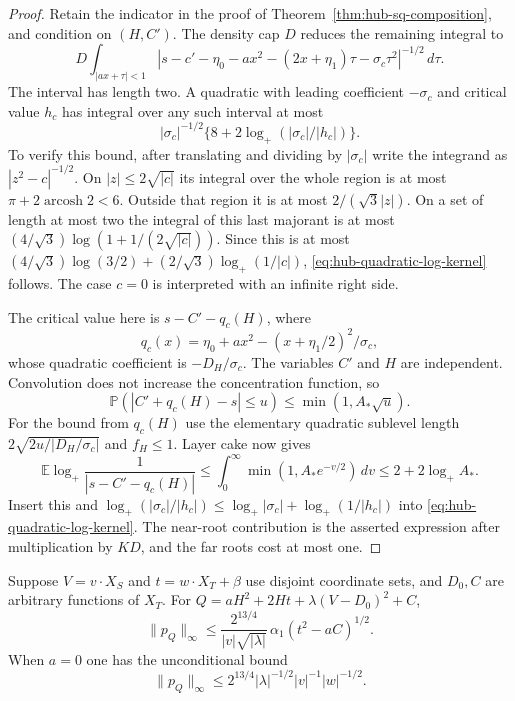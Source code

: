 \begin{proof}
Retain the indicator in the proof of
Theorem~\ref{thm:hub-sq-composition}, and condition on $(H,C')$.
The density cap $D$ reduces the remaining integral to
\[
 D\int_{|ax+\tau|<1}
 |s-c'-\eta_0-ax^2-(2x+\eta_1)\tau-\sigma_c\tau^2|^{-1/2}
                                                        \,d\tau.
\]
The interval has length two.  A quadratic with leading
coefficient $-\sigma_c$ and critical value $h_c$ has integral
over any such interval at most
\begin{equation}\label{eq:hub-quadratic-log-kernel}
 |\sigma_c|^{-1/2}
       \{8+2\log_+(|\sigma_c|/|h_c|)\}.
\end{equation}
To verify this bound, after translating and dividing by
$|\sigma_c|$ write the integrand as $|z^2-c|^{-1/2}$.
On $|z|\le2\sqrt{|c|}$ its integral over the whole region
is at most $\pi+2\operatorname{arcosh}2<6$.
Outside that region it is at most $2/(\sqrt3|z|)$.
On a set of length at most two the integral of this last
majorant is at most
$(4/\sqrt3)\log(1+1/(2\sqrt{|c|}))$.
Since this is at most
$(4/\sqrt3)\log(3/2)+(2/\sqrt3)\log_+(1/|c|)$,
\eqref{eq:hub-quadratic-log-kernel} follows.  The case $c=0$
is interpreted with an infinite right side.

The critical value here is $s-C'-q_c(H)$, where
\[
 q_c(x)=\eta_0+ax^2-(x+\eta_1/2)^2/\sigma_c,
\]
whose quadratic coefficient is $-D_H/\sigma_c$.
The variables $C'$ and $H$ are independent.
Convolution does not increase the concentration function, so
\[
 \mathbb P(|C'+q_c(H)-s|\le u)
 \le\min(1,A_*\sqrt u).
\]
For the bound from $q_c(H)$ use the elementary quadratic
sublevel length $2\sqrt{2u/|D_H/\sigma_c|}$ and $f_H\le1$.
Layer cake now gives
\[
 \mathbb E\log_+\frac1{|s-C'-q_c(H)|}
 \le\int_0^\infty\min(1,A_*e^{-v/2})\,dv
 \le2+2\log_+ A_*.
\]
Insert this and
$\log_+(|\sigma_c|/|h_c|)
\le\log_+|\sigma_c|+\log_+(1/|h_c|)$
into \eqref{eq:hub-quadratic-log-kernel}.
The near-root contribution is the asserted expression after
multiplication by $KD$, and the far roots cost at most one.
\end{proof}

\begin{corollary}
\label{cor:hub-sq-independent}
Suppose $V=v\cdot X_S$ and $t=w\cdot X_T+\beta$ use disjoint
coordinate sets, and $D_0,C$ are arbitrary functions of $X_T$.
For
$Q=aH^2+2Ht+\lambda(V-D_0)^2+C$,
\[
 \|p_Q\|_\infty
 \le\frac{2^{13/4}}{|v|\sqrt{|\lambda|}}\,
        \alpha_1(t^2-aC)^{1/2}.
\]
When $a=0$ one has the unconditional bound
\[
 \|p_Q\|_\infty
 \le 2^{13/4}|\lambda|^{-1/2}|v|^{-1}|w|^{-1/2}.
\]
\end{corollary}

